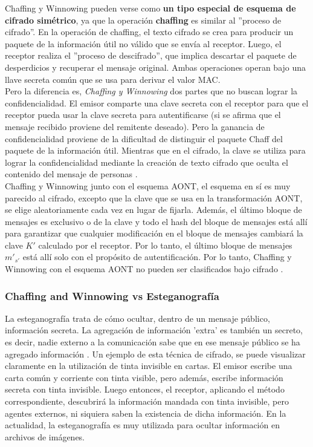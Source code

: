 \documentclass[12pt, a4paper, titlepage]{report}
\begin{document}
        Chaffing y Winnowing pueden verse como \textbf{un tipo especial de esquema de cifrado simétrico}, ya que la operación \textbf{chaffing} es similar al ''proceso de cifrado''. En la operación de chaffing, el texto cifrado se crea para producir un paquete de la informaci\'on \'util no válido que se envía al receptor. Luego, el receptor realiza el ''proceso de descifrado'', que implica descartar el paquete de desperdicios y recuperar el mensaje original. Ambas operaciones operan bajo una llave secreta común que se usa para derivar el valor MAC.\\
        
        Pero la diferencia es, \textit{Chaffing y Winnowing} dos partes que no buscan lograr la confidencialidad. El emisor comparte una clave secreta con el receptor para que el receptor pueda usar la clave secreta para autentificarse (si se afirma que el mensaje recibido proviene del remitente deseado). Pero la ganancia de confidencialidad proviene de la dificultad de distinguir el paquete Chaff del paquete de la informaci\'on \'util. Mientras que en el cifrado, la clave se utiliza para lograr la confidencialidad mediante la creación de texto cifrado que oculta el contenido del mensaje de personas \cite{refCryptohraphyWithoutEncryption}.\\
        
        Chaffing y Winnowing junto con el esquema AONT, el esquema en sí es muy parecido al cifrado, excepto que la clave que se usa en la transformación AONT, se elige aleatoriamente cada vez en lugar de fijarla. Además, el último bloque de mensajes es exclusivo o de la clave y todo el hash del bloque de mensajes está allí para garantizar que cualquier modificación en el bloque de mensajes cambiará la clave $K'$ calculado por el receptor. Por lo tanto, el último bloque de mensajes ${m'}_{s'}$ está allí solo con el propósito de autentificación. Por lo tanto, Chaffing y Winnowing con el esquema AONT no pueden ser clasificados bajo cifrado \cite{refAONT}.\\
        
        \subsubsection{Chaffing and Winnowing vs Esteganograf\'ia}
        La esteganografía trata de cómo ocultar, dentro de un mensaje público, información secreta. La agregación de información 'extra' es también un secreto, es decir, nadie externo a la comunicación sabe que en ese mensaje público se ha agregado información \cite{refCriptografia}. Un ejemplo de esta técnica de cifrado, se puede visualizar claramente en la utilización de tinta invisible en cartas. El emisor escribe una carta común y corriente con tinta visible, pero además, escribe información secreta con tinta invisible. Luego entonces, el receptor, aplicando el método correspondiente, descubrirá la información mandada con tinta invisible, pero agentes externos, ni siquiera saben la existencia de dicha información. En la actualidad, la esteganografía es muy utilizada para ocultar información en archivos de imágenes.\\
        
\end{document}
